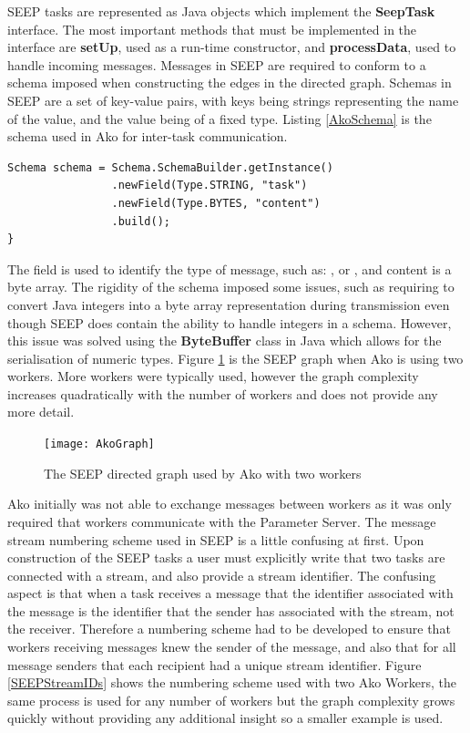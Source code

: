 \documentclass[12pt]{article}
\begin{document}
SEEP tasks are represented as Java objects which implement the \textbf{SeepTask} interface. The most important methods that must be implemented in the interface are \textbf{setUp}, used as a run-time constructor, and \textbf{processData}, used to handle incoming messages. Messages in SEEP are required to conform to a schema imposed when constructing the edges in the directed graph. Schemas in SEEP are a set of key-value pairs, with keys being strings representing the name of the value, and the value being of a fixed type. Listing \ref{AkoSchema} is the schema used in Ako for inter-task communication.

\begin{lstlisting}[caption={The SEEP schema used for Ako},label=AkoSchema]
Schema schema = Schema.SchemaBuilder.getInstance()
                .newField(Type.STRING, "task")
                .newField(Type.BYTES, "content")
                .build();
}
\end{lstlisting}

The  field is used to identify the type of message, such as: , or , and content is a byte array. The rigidity of the schema imposed some issues, such as requiring to convert Java integers into a byte array representation during transmission even though SEEP does contain the ability to handle integers in a schema. However, this issue was solved using the \textbf{ByteBuffer} class in Java which allows for the serialisation of numeric types.
\newline
\newline
Figure \ref{AkoGraph} is the SEEP graph when Ako is using two workers. More workers were typically used, however the graph complexity increases quadratically with the number of workers and does not provide any more detail.

\begin{figure}[H]
  \centering
  \texttt{[image: AkoGraph]}
  \caption[]{The SEEP directed graph used by Ako with two workers}
  \label{AkoGraph}
\end{figure}

Ako initially was not able to exchange messages between workers as it was only required that workers communicate with the Parameter Server. The message stream numbering scheme used in SEEP is a little confusing at first. Upon construction of the SEEP tasks a user must explicitly write that two tasks are connected with a stream, and also provide a stream identifier. The confusing aspect is that when a task receives a message that the identifier associated with the message is the identifier that the sender has associated with the stream, not the receiver. Therefore a numbering scheme had to be developed to ensure that workers receiving messages knew the sender of the message, and also that for all message senders that each recipient had a unique stream identifier. Figure \ref{SEEPStreamIDs} shows the numbering scheme used with two Ako Workers, the same process is used for any number of workers but the graph complexity grows quickly without providing any additional insight so a smaller example is used.
\end{document}
